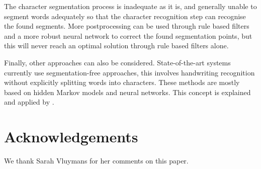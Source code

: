 \documentclass{article}
\begin{document}
The character segmentation process is inadequate as it is, and generally unable to segment words adequately so that the character recognition step can recognise the found segments.
More postprocessing can be used through rule based filters and a more robust neural network to correct the found segmentation points, but this will never reach an optimal solution through rule based filters alone.

Finally, other approaches can also be considered.
State-of-the-art systems currently use segmentation-free approaches, this involves handwriting recognition without explicitly splitting words into characters. These methods are mostly based on hidden Markov models and neural networks.
This concept is explained and applied by \cite{presham}.
\section*{Acknowledgements}
We thank Sarah Vluymans for her comments on this paper.


\end{document}
